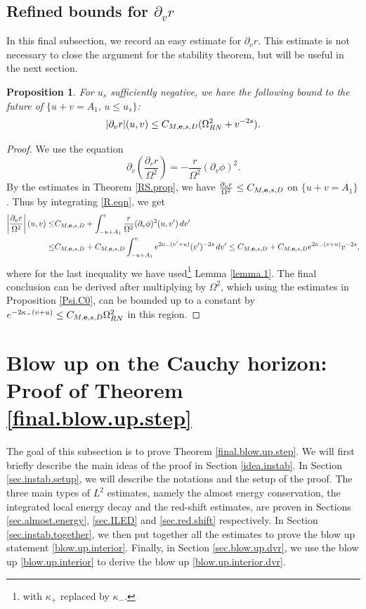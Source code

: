 \documentclass[10pt, reqno]{amsart}
\newtheorem{proposition}[theorem]{Proposition}
\theoremstyle{definition}
\theoremstyle{remark}
\numberwithin{equation}{section}
\newcommand{\rd}{\partial}
\newcommand{\0}{\emptyset}
\newcommand{\Omg}{\Omega}
\newcommand{\f}{\frac}
\begin{document}
\subsection{Refined bounds for $\rd_v r$}\label{add.est}

In this final subsection, we record an easy estimate for $\rd_v r$. This estimate is not necessary to close the argument for the stability theorem, but will be useful in the next section.

\begin{proposition}\label{dvr.improved}
For $u_s$ sufficiently negative, we have the following bound to the future of $\{u+v=A_1,\,u\leq u_s\}$:
$$|\rd_v r|(u,v)\leq C_{M,{\bf e},s,D}(\Omg_{RN}^2+v^{-2s}).$$
\end{proposition}
\begin{proof}
We use the equation 
\begin{equation}\label{R.eqn}
\rd_v \left( \f{\rd_v r}{\Omg^2} \right) =-\f{r}{\Omg^2}(\rd_v\phi)^2.
\end{equation}
By the estimates in Theorem \ref{RS.prop}, we have $\f{\rd_v r}{\Omg^2}\leq C_{M,{\bf e},s,D}$ on $\{u+v=A_1\}$. Thus by integrating \eqref{R.eqn}, we get
\begin{equation*}
\begin{split}
\left\vert \f{\rd_v r}{\Omg^2} \right\vert (u,v) \leq &C_{M,{\bf e},s,D}+\int_{-u+A_1}^v \f{r}{\Omg^2}(\rd_v\phi)^2(u,v')\,dv'\\
\leq &C_{M,{\bf e},s,D}+C_{M,{\bf e},s,D}\int_{-u+A_1}^{v} e^{2\kappa_-(v'+u)} (v')^{-2s}\, dv' \leq C_{M,{\bf e},s,D}+C_{M,{\bf e},s,D} e^{2\kappa_-(v+u)} v^{-2s},
\end{split}
\end{equation*}
where for the last inequality we have used\footnote{with $\kappa_+$ replaced by $\kappa_-$.} Lemma \ref{lemma.1}. The final conclusion can be derived after multiplying by $\Omg^2$, which using the estimates in Proposition \ref{Psi.C0}, can be bounded up to a constant by $e^{-2\kappa_-(v+u)}\leq C_{M,{\bf e},s,D}\Omg^2_{RN}$ in this region.
\end{proof}

\section{Blow up on the Cauchy horizon: Proof of Theorem \ref{final.blow.up.step}}\label{sec.blow.up}

The goal of this subsection is to prove Theorem \ref{final.blow.up.step}. We will first briefly describe the main ideas of the proof in Section \ref{idea.instab}. In Section \ref{sec.instab.setup}, we will describe the notations and the setup of the proof. The three main types of $L^2$ estimates,  namely the almost energy conservation, the integrated local energy decay and the red-shift estimates, are proven in Sections \ref{sec.almost.energy}, \ref{sec.ILED} and \ref{sec.red.shift} respectively. In Section \ref{sec.instab.together}, we then put together all the estimates to prove the blow up statement \eqref{blow.up.interior}. Finally, in Section \ref{sec.blow.up.dvr}, we use the blow up \eqref{blow.up.interior} to derive the blow up \eqref{blow.up.interior.dvr}.
\end{document}
